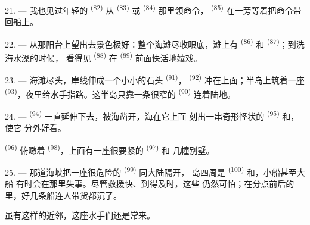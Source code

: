 21. --- 我也见过年轻的 \textsuperscript{(82)} 从
\textsuperscript{(83)} 或 \textsuperscript{(84)} 那里领命令，
 \textsuperscript{(85)} 在一旁等着把命令带回船上。

22. --- 从那阳台上望出去景色极好：整个海滩尽收眼底，滩上有
\textsuperscript{(86)} 和 \textsuperscript{(87)}；到洗海水澡的时候，
看得见 \textsuperscript{(88)} 在 \textsuperscript{(89)}
前面快活地嬉戏。

23. --- 海滩尽头，岸线伸成一个小小的石头 \textsuperscript{(91)}，
 \textsuperscript{(92)} 冲在上面；半岛上筑着一座
\textsuperscript{(93)}，夜里给水手指路。这半岛只靠一条很窄的
\textsuperscript{(90)} 连着陆地。

\VUsaut{3.0mm}
\VUsaut{3.0mm}

24. ---  \textsuperscript{(94)} 一直延伸下去，被海凿开，海在它上面
刻出一串奇形怪状的 \textsuperscript{(95)} 和，使它
分外好看。

 \textsuperscript{(96)} 俯瞰着
\textsuperscript{(98)}，上面有一座很要紧的 \textsuperscript{(97)} 和
几幢别墅。

25. --- 那道海峡把一座很危险的 \textsuperscript{(99)} 同大陆隔开，
岛四周是 \textsuperscript{(100)} 和，小船甚至大船
有时会在那里失事。尽管救援快、到得及时，这些
仍然可怕；在分点前后的里，好几条船连人带货都沉了。

虽有这样的近邻，这座水手们还是常来。
\VUsaut{6.0mm}
\VUfilet{22mm}
